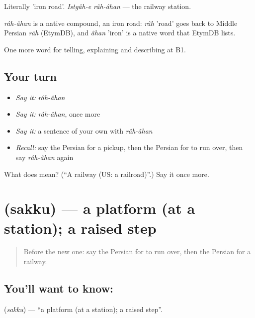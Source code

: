 Literally 'iron road'. \emph{Istgâh-e râh-âhan} — the railway station.

\begin{cousinweb}
\emph{râh-âhan} is a native compound, an iron road: \emph{râh} 'road' goes back to Middle Persian \emph{rāh} (EtymDB), and \emph{âhan} 'iron' is a native word that EtymDB lists.
\end{cousinweb}

\begin{grammarlens}[title={What you've built}]
One more word for telling, explaining and describing at B1.
\end{grammarlens}

\subsection*{Your turn}
\begin{itemize}
\raggedright
  \item \emph{Say it:} \emph{râh-âhan}
  \item \emph{Say it:} \emph{râh-âhan}, once more
  \item \emph{Say it:} a sentence of your own with \emph{râh-âhan}
  \item \emph{Recall:} say the Persian for a pickup, then the Persian for to run over, then say \emph{râh-âhan} again
\end{itemize}

\begin{tcolorbox}[breakable,colback=teal!4,colframe=teal!35!black,title={Before you move on}]
What does   mean? (\textquotedblleft{}A railway (US: a railroad)\textquotedblright{}.) Say it once more.
\end{tcolorbox}
\section[\texorpdfstring{\fa{سکو} (sakku)}{سکو (sakku)}]{ (sakku) — a platform (at a station); a raised step}

\label{lesson:FA-C429-sakku}



\begin{quote}
Before the new one: say the Persian for to run over, then the Persian for a railway.
\end{quote}

\subsection*{You'll want to know: }
\textbf{} (\emph{sakku}) — \textquotedblleft{}a platform (at a station); a raised step\textquotedblright{}.

